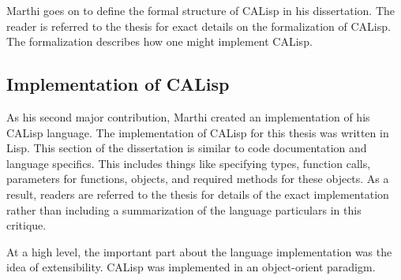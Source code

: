 \documentclass[jair,twoside,11pt,theapa]{article}
\begin{document}
Marthi goes on to define the formal structure of CALisp in his dissertation. The reader is referred to the thesis for exact details on the formalization of CALisp. The formalization describes how one might implement CALisp. 



\subsection{Implementation of CALisp}
\label{Implementation}
As his second major contribution, Marthi created an implementation of his CALisp language. The implementation of CALisp for this thesis was written in Lisp.  This section of the dissertation is similar to code documentation and language specifics. This includes things like specifying types, function calls, parameters for functions, objects, and required methods for these objects. As a result, readers are referred to the thesis for details of the exact implementation rather than including a summarization of the language particulars in this critique. 

At a high level, the important part about the language implementation was the idea of extensibility. CALisp was implemented in an object-orient paradigm. 

\end{document}
